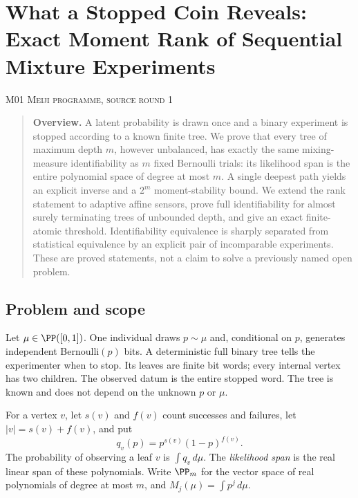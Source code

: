 \documentclass[11pt,a4paper]{article}
\theoremstyle{definition}\newtheorem{definition}[theorem]{Definition}
\theoremstyle{remark}\newtheorem{remark}[theorem]{Remark}
\numberwithin{equation}{section}
\begin{document}
\clearpage
\section[M01 --- What a Stopped Coin Reveals: Exact Moment Rank of Sequential Mixture Experiments]{What a Stopped Coin Reveals: Exact Moment Rank of Sequential Mixture Experiments}\label{contrib-M01}
\noindent\textsc{M01 \quad Meiji programme, source round 1}\par\medskip


\begin{quote}\small\textbf{Overview.} A latent probability is drawn once and a binary experiment is stopped according to a known finite tree. We prove that every tree of maximum depth $m$, however unbalanced, has exactly the same mixing-measure identifiability as $m$ fixed Bernoulli trials: its likelihood span is the entire polynomial space of degree at most $m$. A single deepest path yields an explicit inverse and a $2^m$ moment-stability bound. We extend the rank statement to adaptive affine sensors, prove full identifiability for almost surely terminating trees of unbounded depth, and give an exact finite-atomic threshold. Identifiability equivalence is sharply separated from statistical equivalence by an explicit pair of incomparable experiments. These are proved statements, not a claim to solve a previously named open problem.\end{quote}

\subsection{Problem and scope}\label{M01-sec-1}
Let $\mu\in\PP([0,1])$. One individual draws $p\sim\mu$ and, conditional on $p$, generates independent Bernoulli$(p)$ bits. A deterministic full binary tree tells the experimenter when to stop. Its leaves are finite bit words; every internal vertex has two children. The observed datum is the entire stopped word. The tree is known and does not depend on the unknown $p$ or $\mu$.

For a vertex $v$, let $s(v)$ and $f(v)$ count successes and failures, let $|v|=s(v)+f(v)$, and put
\[
 q_v(p)=p^{s(v)}(1-p)^{f(v)}.
\]
The probability of observing a leaf $v$ is $\int q_v\,d\mu$. The \emph{likelihood span} is the real linear span of these polynomials. Write $\PP_m$ for the vector space of real polynomials of degree at most $m$, and $M_j(\mu)=\int p^j\,d\mu$.
\end{document}
